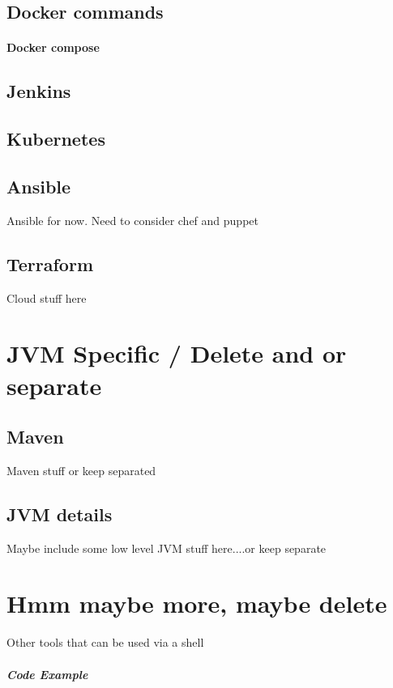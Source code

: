 \documentclass[a4paper, 11pt]{book}
\begin{document}
    \section{Docker commands}

    \subsubsection{Docker compose}


    \section{Jenkins}


    \section{Kubernetes}


    \section{Ansible}
    Ansible for now. Need to consider chef and puppet


    \section{Terraform}
    Cloud stuff here


    \chapter{JVM Specific / Delete and or separate}


    \section{Maven}
    Maven stuff or keep separated


    \section{JVM details}
    Maybe include some low level JVM stuff here....or keep separate


    \chapter{Hmm maybe more, maybe delete}
    Other tools that can be used via a shell

    \paragraph{Code Example}
\end{document}

